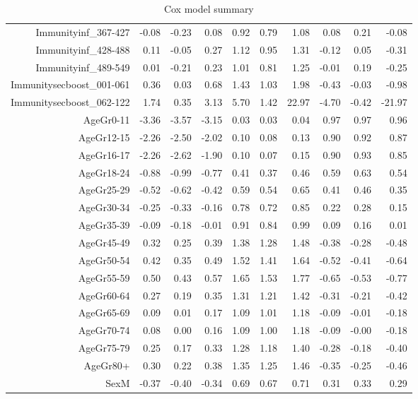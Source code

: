 \begin{table}[ht]
\begin{tabular}{rrrrrrrrrr}
  Immunityinf\_367-427 & -0.08 & -0.23 & 0.08 & 0.92 & 0.79 & 1.08 & 0.08 & 0.21 & -0.08 \\ 
  Immunityinf\_428-488 & 0.11 & -0.05 & 0.27 & 1.12 & 0.95 & 1.31 & -0.12 & 0.05 & -0.31 \\ 
  Immunityinf\_489-549 & 0.01 & -0.21 & 0.23 & 1.01 & 0.81 & 1.25 & -0.01 & 0.19 & -0.25 \\ 
  Immunitysecboost\_001-061 & 0.36 & 0.03 & 0.68 & 1.43 & 1.03 & 1.98 & -0.43 & -0.03 & -0.98 \\ 
  Immunitysecboost\_062-122 & 1.74 & 0.35 & 3.13 & 5.70 & 1.42 & 22.97 & -4.70 & -0.42 & -21.97 \\ 
  AgeGr0-11 & -3.36 & -3.57 & -3.15 & 0.03 & 0.03 & 0.04 & 0.97 & 0.97 & 0.96 \\ 
  AgeGr12-15 & -2.26 & -2.50 & -2.02 & 0.10 & 0.08 & 0.13 & 0.90 & 0.92 & 0.87 \\ 
  AgeGr16-17 & -2.26 & -2.62 & -1.90 & 0.10 & 0.07 & 0.15 & 0.90 & 0.93 & 0.85 \\ 
  AgeGr18-24 & -0.88 & -0.99 & -0.77 & 0.41 & 0.37 & 0.46 & 0.59 & 0.63 & 0.54 \\ 
  AgeGr25-29 & -0.52 & -0.62 & -0.42 & 0.59 & 0.54 & 0.65 & 0.41 & 0.46 & 0.35 \\ 
  AgeGr30-34 & -0.25 & -0.33 & -0.16 & 0.78 & 0.72 & 0.85 & 0.22 & 0.28 & 0.15 \\ 
  AgeGr35-39 & -0.09 & -0.18 & -0.01 & 0.91 & 0.84 & 0.99 & 0.09 & 0.16 & 0.01 \\ 
  AgeGr45-49 & 0.32 & 0.25 & 0.39 & 1.38 & 1.28 & 1.48 & -0.38 & -0.28 & -0.48 \\ 
  AgeGr50-54 & 0.42 & 0.35 & 0.49 & 1.52 & 1.41 & 1.64 & -0.52 & -0.41 & -0.64 \\ 
  AgeGr55-59 & 0.50 & 0.43 & 0.57 & 1.65 & 1.53 & 1.77 & -0.65 & -0.53 & -0.77 \\ 
  AgeGr60-64 & 0.27 & 0.19 & 0.35 & 1.31 & 1.21 & 1.42 & -0.31 & -0.21 & -0.42 \\ 
  AgeGr65-69 & 0.09 & 0.01 & 0.17 & 1.09 & 1.01 & 1.18 & -0.09 & -0.01 & -0.18 \\ 
  AgeGr70-74 & 0.08 & 0.00 & 0.16 & 1.09 & 1.00 & 1.18 & -0.09 & -0.00 & -0.18 \\ 
  AgeGr75-79 & 0.25 & 0.17 & 0.33 & 1.28 & 1.18 & 1.40 & -0.28 & -0.18 & -0.40 \\ 
  AgeGr80+ & 0.30 & 0.22 & 0.38 & 1.35 & 1.25 & 1.46 & -0.35 & -0.25 & -0.46 \\ 
  SexM & -0.37 & -0.40 & -0.34 & 0.69 & 0.67 & 0.71 & 0.31 & 0.33 & 0.29 \\ 
   \hline
\end{tabular}
\caption{Cox model summary} 
\end{table}
